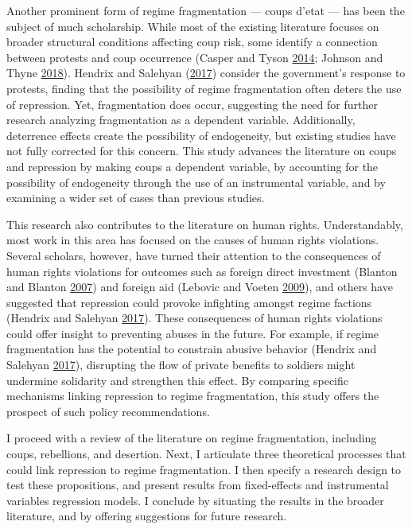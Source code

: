 \documentclass[
  12pt,
]{article}
\begin{document}
Another prominent form of regime fragmentation --- coups d'etat --- has been the subject of much scholarship. While most of the existing literature focuses on broader structural conditions affecting coup risk, some identify a connection between protests and coup occurrence (Casper and Tyson \protect\hyperlink{ref-Casper2014}{2014}; Johnson and Thyne \protect\hyperlink{ref-Johnson2018}{2018}). Hendrix and Salehyan (\protect\hyperlink{ref-Hendrix2017}{2017}) consider the government's response to protests, finding that the possibility of regime fragmentation often deters the use of repression. Yet, fragmentation does occur, suggesting the need for further research analyzing fragmentation as a dependent variable. Additionally, deterrence effects create the possibility of endogeneity, but existing studies have not fully corrected for this concern. This study advances the literature on coups and repression by making coups a dependent variable, by accounting for the possibility of endogeneity through the use of an instrumental variable, and by examining a wider set of cases than previous studies.

This research also contributes to the literature on human rights. Understandably, most work in this area has focused on the causes of human rights violations. Several scholars, however, have turned their attention to the consequences of human rights violations for outcomes such as foreign direct investment (Blanton and Blanton \protect\hyperlink{ref-Blanton2007}{2007}) and foreign aid (Lebovic and Voeten \protect\hyperlink{ref-Lebovic2009}{2009}), and others have suggested that repression could provoke infighting amongst regime factions (Hendrix and Salehyan \protect\hyperlink{ref-Hendrix2017}{2017}). These consequences of human rights violations could offer insight to preventing abuses in the future. For example, if regime fragmentation has the potential to constrain abusive behavior (Hendrix and Salehyan \protect\hyperlink{ref-Hendrix2017}{2017}), disrupting the flow of private benefits to soldiers might undermine solidarity and strengthen this effect. By comparing specific mechanisms linking repression to regime fragmentation, this study offers the prospect of such policy recommendations.

I proceed with a review of the literature on regime fragmentation, including coups, rebellions, and desertion. Next, I articulate three theoretical processes that could link repression to regime fragmentation. I then specify a research design to test these propositions, and present results from fixed-effects and instrumental variables regression models. I conclude by situating the results in the broader literature, and by offering suggestions for future research.
\end{document}
